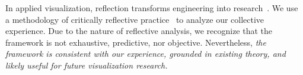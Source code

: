 \begin{tcolorbox}[floatplacement=t,float,title=Learning from Experience with Critically Reflective Practice]

In applied visualization, reflection transforms engineering into research~\cite{Sedlmair2012}. We use a methodology of critically reflective practice~\cite{Brookfield1998} to analyze our collective experience. Due to the nature of reflective analysis, we recognize that the framework is not exhaustive, predictive, nor objective. Nevertheless, {\it the framework is consistent with our experience, grounded in existing theory, and likely useful for future visualization research.}

\end{tcolorbox}
